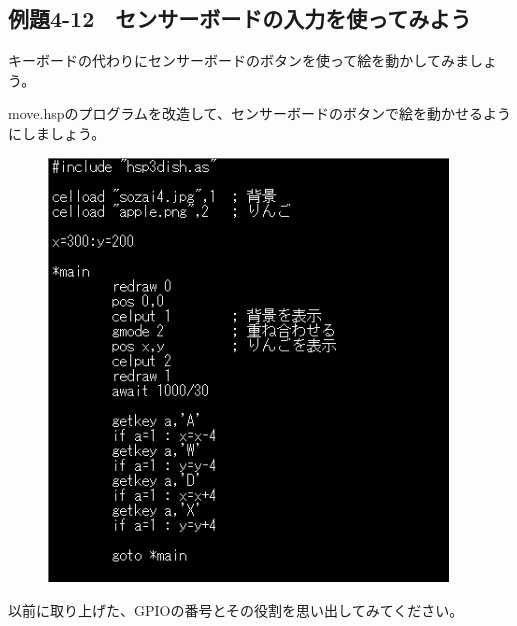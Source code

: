 \newpage
\subsection{例題4-12　センサーボードの入力を使ってみよう}


\begin{description}
    \item {}
\end{description}

キーボードの代わりにセンサーボードのボタンを使って絵を動かしてみましょう。

move.hspのプログラムを改造して、センサーボードのボタンで絵を動かせるようにしましょう。

\begin{figure}[H]
    \begin{center}
      \includegraphics[keepaspectratio,width=10.61cm,height=11.229cm]{text04-img/s_move.png}
    \end{center}
    \label{fig:prog_menu}
\end{figure}

\begin{description}
    \item {}
\end{description}

以前に取り上げた、GPIOの番号とその役割を思い出してみてください。



